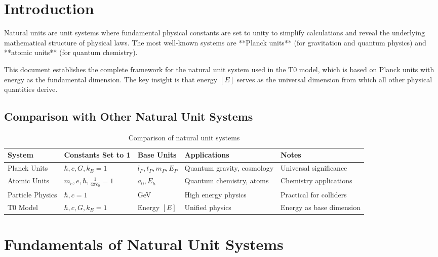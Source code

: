 \documentclass[11pt,a4paper]{article}
\begin{document}
	\newpage
	
	\section{Introduction}
	
	Natural units are unit systems where fundamental physical constants are set to unity to simplify calculations and reveal the underlying mathematical structure of physical laws. The most well-known systems are **Planck units** (for gravitation and quantum physics) and **atomic units** (for quantum chemistry).
	
	This document establishes the complete framework for the natural unit system used in the T0 model, which is based on Planck units with energy as the fundamental dimension. The key insight is that energy $[E]$ serves as the universal dimension from which all other physical quantities derive.
	
	\subsection{Comparison with Other Natural Unit Systems}
	
	\begin{table}[htbp]
		\centering
		\begin{adjustbox}{width=0.95\textwidth}
			\begin{tabular}{lllll}
				\toprule
				\textbf{System} & \textbf{Constants Set to 1} & \textbf{Base Units} & \textbf{Applications} & \textbf{Notes} \\
				\midrule
				Planck Units & $\hbar, c, G, k_B = 1$ & $l_P, t_P, m_P, E_P$ & Quantum gravity, cosmology & Universal significance \\
				Atomic Units & $m_e, e, \hbar, \frac{1}{4\pi\varepsilon_0} = 1$ & $a_0, E_h$ & Quantum chemistry, atoms & Chemistry applications \\
				Particle Physics & $\hbar, c = 1$ & GeV & High energy physics & Practical for colliders \\
				T0 Model & $\hbar, c, G, k_B = 1$ & Energy $[E]$ & Unified physics & Energy as base dimension \\
				\bottomrule
			\end{tabular}
		\end{adjustbox}
		\caption{Comparison of natural unit systems}
		\label{tab:unit_systems}
	\end{table}
	
	\section{Fundamentals of Natural Unit Systems}
	
\end{document}

